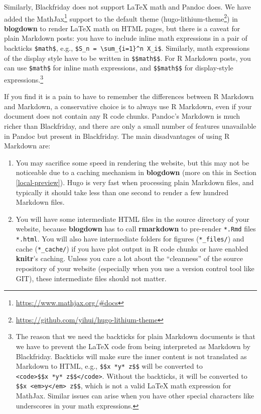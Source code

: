 \documentclass[12pt,]{krantz}
\renewcommand{\href}[2]{#2\footnote{\url{#1}}}
\theoremstyle{definition}
\theoremstyle{definition}
\theoremstyle{definition}
\theoremstyle{remark}
\begin{document}
Similarly, Blackfriday does not support LaTeX math and Pandoc does. We
have added the \href{https://www.mathjax.org/\#docs}{MathJax}
 support to the default theme
(\href{https://github.com/yihui/hugo-lithium-theme}{hugo-lithium-theme})
in \textbf{blogdown} to render LaTeX math on HTML pages, but there is a
caveat for plain Markdown posts: you have to include inline math
expressions in a pair of backticks
\texttt{\textasciigrave{}\$math\$\textasciigrave{}}, e.g.,
\texttt{\textasciigrave{}\$S\_n\ =\ \textbackslash{}sum\_\{i=1\}\^{}n\ X\_i\$\textasciigrave{}}.
Similarly, math expressions of the display style have to be written in
\texttt{\textasciigrave{}\$\$math\$\$\textasciigrave{}}. For R Markdown
posts, you can use \texttt{\$math\$} for inline math expressions, and
\texttt{\$\$math\$\$} for display-style expressions.\footnote{The reason
  that we need the backticks for plain Markdown documents is that we
  have to prevent the LaTeX code from being interpreted as Markdown by
  Blackfriday. Backticks will make sure the inner content is not
  translated as Markdown to HTML, e.g.,
  \texttt{\textasciigrave{}\$\$x\ *y*\ z\$\$\textasciigrave{}} will be
  converted to
  \texttt{\textless{}code\textgreater{}\$\$x\ *y*\ z\$\$\textless{}/code\textgreater{}}.
  Without the backticks, it will be converted to
  \texttt{\$\$x\ \textless{}em\textgreater{}y\textless{}/em\textgreater{}\ z\$\$},
  which is not a valid LaTeX math expression for MathJax. Similar issues
  can arise when you have other special characters like underscores in
  your math expressions.}

If you find it is a pain to have to remember the differences between R
Markdown and Markdown, a conservative choice is to always use R
Markdown, even if your document does not contain any R code chunks.
Pandoc's Markdown is much richer than Blackfriday, and there are only a
small number of features unavailable in Pandoc but present in
Blackfriday. The main disadvantages of using R Markdown are:

\begin{enumerate}
\def\labelenumi{\arabic{enumi}.}
\item
  You may sacrifice some speed in rendering the website, but this may
  not be noticeable due to a caching mechanism in \textbf{blogdown}
  (more on this in Section \ref{local-preview}). Hugo is very fast when
  processing plain Markdown files, and typically it should take less
  than one second to render a few hundred Markdown files.
\item
  You will have some intermediate HTML files in the source directory of
  your website, because \textbf{blogdown} has to call \textbf{rmarkdown}
  to pre-render \texttt{*.Rmd} files \texttt{*.html}. You will also have
  intermediate folders for figures (\texttt{*\_files/}) and cache
  (\texttt{*\_cache/}) if you have plot output in R code chunks or have
  enabled \textbf{knitr}'s caching. Unless you care a lot about the
  ``cleanness'' of the source repository of your website (especially
  when you use a version control tool like GIT), these intermediate
  files should not matter.
\end{enumerate}
\end{document}
